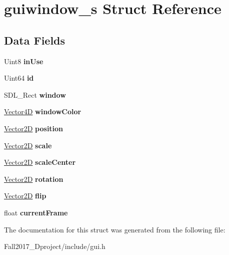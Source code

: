\hypertarget{structguiwindow__s}{}\section{guiwindow\+\_\+s Struct Reference}
\label{structguiwindow__s}
\subsection*{Data Fields}
\begin{DoxyCompactItemize}
\item 
\mbox{\label{structguiwindow__s_a11061b5287f78ab2e0ceba22ecb7cb49}} 
Uint8 {\bfseries in\+Use}
\item 
\mbox{\label{structguiwindow__s_a4158e9a3af9337e59f9b8de984c0efba}} 
Uint64 {\bfseries id}
\item 
\mbox{\label{structguiwindow__s_a919229fae17969e3b7654415a1ddfd06}} 
S\+D\+L\+\_\+\+Rect {\bfseries window}
\item 
\mbox{\label{structguiwindow__s_a51801116a41ba4f4c50852a351bb44c6}} 
\hyperlink{struct_vector4_d}{Vector4D} {\bfseries window\+Color}
\item 
\mbox{\label{structguiwindow__s_a2dc349a13930beaf26472e0d04d9563e}} 
\hyperlink{struct_vector2_d}{Vector2D} {\bfseries position}
\item 
\mbox{\label{structguiwindow__s_a1b187f4d1f81894380925e9de933801a}} 
\hyperlink{struct_vector2_d}{Vector2D} {\bfseries scale}
\item 
\mbox{\label{structguiwindow__s_a8ff0fe80de1fcc51fee6f1d766e9de8b}} 
\hyperlink{struct_vector2_d}{Vector2D} {\bfseries scale\+Center}
\item 
\mbox{\label{structguiwindow__s_ac4e0ffa54c436c5dad6ca9481266f9ed}} 
\hyperlink{struct_vector2_d}{Vector2D} {\bfseries rotation}
\item 
\mbox{\label{structguiwindow__s_afc50ca9ba71427ea7962929de4b0e1bb}} 
\hyperlink{struct_vector2_d}{Vector2D} {\bfseries flip}
\item 
\mbox{\label{structguiwindow__s_a6c816fc91c0d3b73641b802cc889195d}} 
float {\bfseries current\+Frame}
\end{DoxyCompactItemize}


The documentation for this struct was generated from the following file\+:\begin{DoxyCompactItemize}
\item 
Fall2017\+\_\+Dproject/include/gui.\+h\end{DoxyCompactItemize}
